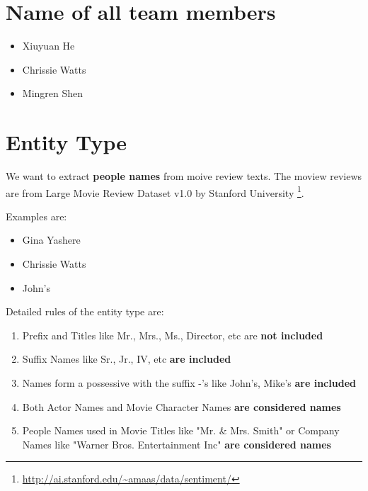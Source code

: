 \documentclass{article}
\begin{document}
\printAffiliationsAndNotice{\icmlEqualContribution} %




\section{Name of all team members}

\begin{itemize}
\setlength\itemsep{0.01em}
\item Xiuyuan He
\item Chrissie Watts
\item Mingren Shen
\end{itemize}

\section{Entity Type}

We want to extract \textbf{people names} from moive review texts. The moview reviews are from Large Movie Review Dataset v1.0 \cite{maas-EtAl:2011:ACL-HLT2011} by Stanford University \footnote{\url{http://ai.stanford.edu/~amaas/data/sentiment/}}.

Examples are:
\begin{itemize}
\setlength\itemsep{0.01em}
\item Gina Yashere
\item Chrissie Watts
\item John's
\end{itemize}

Detailed rules of the entity type are:

\begin{enumerate}
\setlength\itemsep{0.01em}
\item Prefix and Titles like Mr., Mrs., Ms., Director, etc are \textbf{not included}
\item Suffix Names like Sr., Jr., IV, etc \textbf{ are included}
\item Names form a possessive with the suffix -'s like John's, Mike's \textbf{are included}
\item Both Actor Names and Movie Character Names \textbf{are considered names}
\item People Names used in Movie Titles like "Mr. \& Mrs. Smith"  or Company Names like "Warner Bros. Entertainment Inc" \textbf{are considered names}
\end{enumerate}
\end{document}
